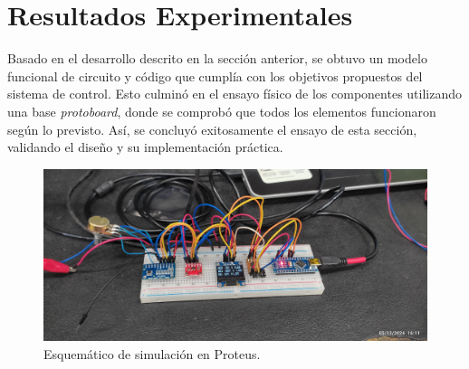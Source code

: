 \section{Resultados Experimentales}
Basado en el desarrollo descrito en la sección anterior, se obtuvo un modelo funcional de circuito y código que cumplía con los objetivos propuestos del sistema de control. Esto culminó en el ensayo físico de los componentes utilizando una base \textit{protoboard}, donde se comprobó que todos los elementos funcionaron según lo previsto. Así, se concluyó exitosamente el ensayo de esta sección, validando el diseño y su implementación práctica.
\begin{figure}[H]
    \centering
    \includegraphics[scale=0.08]{./imagenes/ensayo_digital.jpg}
    \caption{Esquemático de simulación en Proteus.}
    \label{F:esquematico_proteus}
\end{figure}